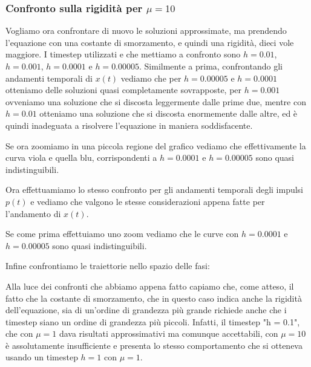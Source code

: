 \documentclass[12pt]{article}
\begin{document}
\subsubsection{Confronto sulla rigidità per $\mu = 10$}
Vogliamo ora confrontare di nuovo le soluzioni approssimate, ma prendendo l'equazione con una costante di smorzamento, e quindi una rigidità, dieci vole maggiore. I timestep utilizzati e che mettiamo a confronto sono $h=0.01$, $h=0.001$, $h=0.0001$ e $h=0.00005$. Similmente a prima, confrontando gli andamenti temporali di $x(t)$ vediamo che per $h = 0.00005$ e $h = 0.0001$ otteniamo delle soluzioni quasi completamente sovrapposte, per $h = 0.001$ ovveniamo una soluzione che si discosta leggermente dalle prime due, mentre con $h = 0.01$ otteniamo una soluzione che si discosta enormemente dalle altre, ed è quindi inadeguata a risolvere l'equazione in maniera soddisfacente.
\begin{figure}[H]
	\centering
	
\end{figure}
Se ora zoomiamo in una piccola regione del grafico vediamo che effettivamente la curva viola e quella blu, corrispondenti a $h = 0.0001$ e $h = 0.00005$ sono quasi indistinguibili. 
\begin{figure}[H]
	\centering
	
\end{figure}
Ora effettuamiamo lo stesso confronto per gli andamenti temporali degli impulsi $p(t)$
e vediamo che valgono le stesse considerazioni appena fatte per l'andamento di $x(t)$. 
\begin{figure}[H]
	\centering
	
\end{figure}
Se come prima effettuiamo uno zoom vediamo che le curve con $h = 0.0001$ e $h = 0.00005$ sono quasi indistinguibili.
\begin{figure}[H]
	\centering
	
\end{figure}
Infine confrontiamo le traiettorie nello spazio delle fasi:
\begin{figure}[H]
	\centering
	
\end{figure}
Alla luce dei confronti che abbiamo appena fatto capiamo che, come atteso, il fatto che la costante di smorzamento, che in questo caso indica anche la rigidità dell'equazione, sia di un'ordine di grandezza più grande richiede anche che i timestep siano un ordine di grandezza più piccoli. Infatti, il timestep "h = 0.1", che con $\mu = 1$ dava risultati approssimativi ma comunque accettabili, con $\mu=10$ è assolutamente insufficiente e presenta lo stesso comportamento che si otteneva usando un timestep $h = 1$ con $\mu = 1$. 
\end{document}
